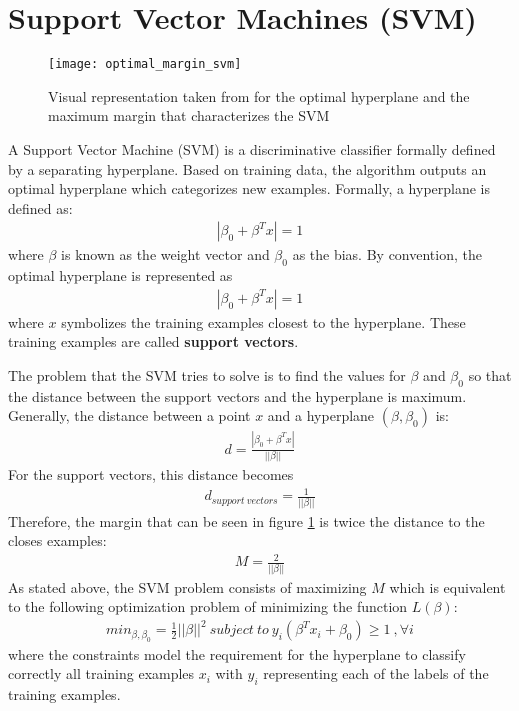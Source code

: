 \section{Support Vector Machines (SVM)}
\begin{figure}[H]
	\captionsetup{width=15cm,font=small}
	\begin{center}
		\texttt{[image: optimal\_margin\_svm]}
		\caption[Support Vector Machine optimal hyperplane]{Visual representation taken from \cite{itseez2014theopencv} for the optimal hyperplane and the maximum margin that characterizes the SVM}
		\label{fig:optimal_margin_svm}
	\end{center}
\end{figure}
A Support Vector Machine (SVM) is a discriminative classifier formally defined by a separating hyperplane. Based on training data, the algorithm outputs an optimal hyperplane which categorizes new examples. Formally, a hyperplane is defined as:
\begin{align}
	|\beta_{0} + \beta^{T}x| = 1
\end{align}
where $\beta$ is known as the weight vector and $\beta_{0}$ as the bias.
By convention, the optimal hyperplane is represented as
\begin{align}
	|\beta_{0} + \beta^{T}x| = 1
\end{align}
where $x$  symbolizes the training examples closest to the hyperplane. These training examples are called \textbf{support vectors}. 

The problem that the SVM tries to solve is to find the values for $\beta$ and $\beta_{0}$ so that the distance between the support vectors and the hyperplane is maximum. Generally, the distance between a point $x$ and a hyperplane $(\beta, \beta_{0})$ is:
\begin{align}
d = \frac{|\beta_{0} + \beta^{T}x|}{||\beta||}
\end{align}
For the support vectors, this distance becomes
\begin{align}
d_{support\ vectors} = \frac{1}{||\beta||}
\end{align}
Therefore, the margin that can be seen in figure \ref{fig:optimal_margin_svm} is twice the distance to the closes examples:
\begin{align}
M = \frac{2}{||\beta||}
\end{align}
As stated above, the SVM problem consists of maximizing $M$ which is equivalent to the following optimization problem of minimizing the function $L(\beta)$:
\begin{align}
min_{\beta, \beta_{0}} = \frac{1}{2}||\beta||^2\ subject\ to\ y_i(\beta^T x_{i} + \beta_{0}) \geq 1\ ,\forall i
\end{align}
where the constraints model the requirement for the hyperplane to classify correctly all training examples $x_i$ with $y_i$ representing each of the labels of the training examples.